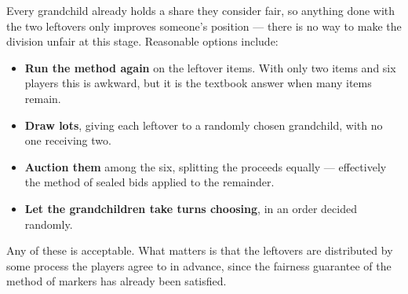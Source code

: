 \documentclass[12pt]{ximera}
\begin{document}
\begin{problem}
\begin{prompt}
\begin{feedback}
Every grandchild already holds a share they consider fair, so anything done with the
two leftovers only improves someone's position --- there is no way to make the division
unfair at this stage. Reasonable options include:

\begin{itemize}
\item \textbf{Run the method again} on the leftover items. With only two items and six
      players this is awkward, but it is the textbook answer when many items remain.
\item \textbf{Draw lots}, giving each leftover to a randomly chosen grandchild, with no
      one receiving two.
\item \textbf{Auction them} among the six, splitting the proceeds equally --- effectively
      the method of sealed bids applied to the remainder.
\item \textbf{Let the grandchildren take turns choosing}, in an order decided randomly.
\end{itemize}

Any of these is acceptable. What matters is that the leftovers are distributed by some
process the players agree to in advance, since the fairness guarantee of the method of
markers has already been satisfied.
\end{feedback}
\end{prompt}
\end{problem}
\end{document}
